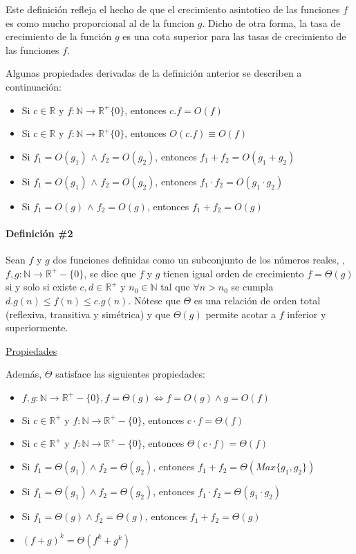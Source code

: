 Este definición refleja el hecho de que el crecimiento asintotico de las funciones $f$ es como mucho proporcional al de la funcion $g$. Dicho de otra forma, la tasa de crecimiento de la función $g$ es una
cota superior para las tasas de crecimiento de las funciones $f$.

Algunas propiedades derivadas de la definición anterior se describen a continuación:
\begin{itemize}
\item Si $c \in \mathbb{R}$ y $f:\mathbb{N} \to \mathbb{R}^+ \lbrace 0 \rbrace$, entonces $c.f = O(f)$
\item Si $c \in \mathbb{R}$ y $f:\mathbb{N} \to \mathbb{R}^+ \lbrace 0 \rbrace$, entonces $O(c.f) \equiv O(f)$
\item Si $f_1 = O(g_1)$ $\wedge$ $f_2 = O(g_2)$, entonces $f_1 + f_2 = O(g_1 + g_2)$
\item Si $f_1 = O(g_1)$ $\wedge$ $f_2 = O(g_2)$, entonces $f_1 \cdot f_2 = O(g_1 \cdot g_2)$
\item Si $f_1 = O(g)$ $\wedge$ $f_2 = O(g)$, entonces $f_1 + f_2 = O(g)$
\end{itemize}

\paragraph{Definición \#2}

Sean $f$ y $g$ dos funciones definidas como un subconjunto de los números reales, , $f,g:\mathbb{N} \to \mathbb{R}^+-\{0\}$, se dice que $f$ y $g$ tienen igual orden de crecimiento $f=\Theta(g)$ si y solo si existe $c,d \in \mathbb{R}^+$ y $n_0 \in \mathbb{N}$ tal que $\forall n > n_0$ se cumpla $d.g(n) \le f(n) \le c.g(n)$. Nótese que $\Theta$ es una relación de orden total (reflexiva, transitiva y simétrica) y que $\Theta(g)$ permite acotar a $f$ inferior y superiormente.

\underline{Propiedades}

Además, $\Theta$ satisface las siguientes propiedades:

\begin{itemize}
\item $f, g : \mathbb{N} \to \mathbb{R}^{+}-\{0\}, f = \Theta (g) \Leftrightarrow f = O(g) \wedge g = O(f)$
\item Si $c \in \mathbb{R}^{+}$ y $f: \mathbb{N} \to \mathbb{R}^{+}-\{0\}$, entonces $c \cdot f = \Theta(f)$
\item Si $c \in \mathbb{R}^{+}$ y $f: \mathbb{N} \to \mathbb{R}^{+}-\{0\}$, entonces $\Theta(c \cdot f) = \Theta(f)$
\item Si $f_1 = \Theta(g_1) \wedge f_2 = \Theta(g_2)$, entonces $f_1 + f_2 = \Theta (Max\{g_1, g_2\})$
\item Si $f_1 = \Theta(g_1) \wedge f_2 = \Theta(g_2)$, entonces $f_1 \cdot f_2 = \Theta (g_1 \cdot g_2)$
\item Si $f_1 = \Theta(g) \wedge f_2 = \Theta(g)$, entonces $f_1 + f_2 = \Theta (g)$
\item $(f+g)^k = \Theta(f^k + g^k)$
\end{itemize}

